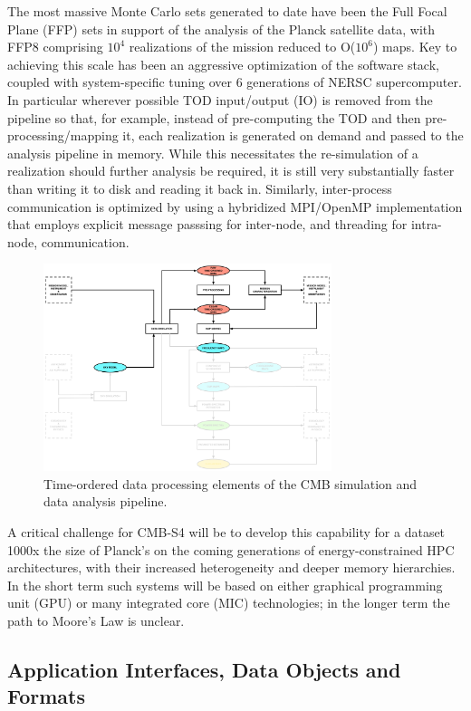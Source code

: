 The most massive Monte Carlo sets generated to date have been the Full Focal Plane (FFP) sets in support of the analysis of the Planck satellite data, with FFP8 comprising $10^4$ realizations of the mission reduced to O($10^6$) maps. Key to achieving this scale has been an aggressive optimization of the software stack, coupled with system-specific tuning over 6 generations of NERSC supercomputer. In particular wherever possible TOD input/output (IO) is removed from the pipeline so that, for example, instead of pre-computing the TOD and then pre-processing/mapping it, each realization is generated on demand and passed to the analysis pipeline in memory. While this necessitates the re-simulation of a realization should further analysis be required, it is still very substantially faster than writing it to disk and reading it back in. Similarly, inter-process communication is optimized by using a hybridized MPI/OpenMP implementation that employs explicit message passsing for inter-node, and threading for intra-node, communication.

\begin{figure}[tbp]
\centering
\includegraphics[width=0.75\textwidth]{Analysis/all_tod}
\caption{Time-ordered data processing elements of the CMB simulation and data analysis pipeline.}
\label{fig_all_tod}
\end{figure}

A critical challenge for CMB-S4 will be to develop this capability for a dataset 1000x the size of Planck's on the coming generations of energy-constrained HPC architectures, with their increased heterogeneity and deeper memory hierarchies. In the short term such systems will be based on either graphical programming unit (GPU) or many integrated core (MIC) technologies; in the longer term the path to Moore's Law is unclear.


\subsection{Application Interfaces, Data Objects and Formats}

%



